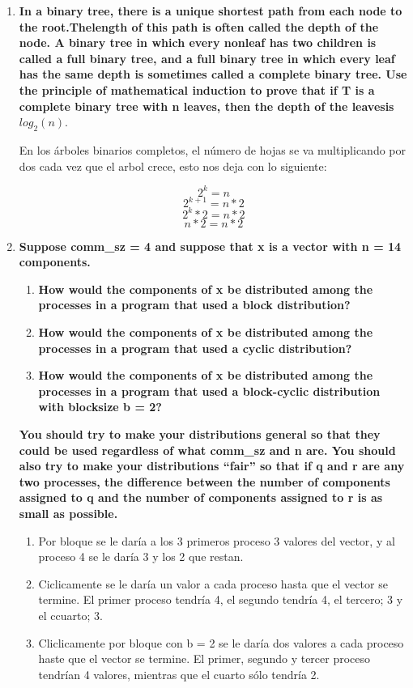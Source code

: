 \documentclass[a4paper,12pt]{article}
\begin{document}
\begin{enumerate}
\item \textbf{In a binary tree, there is a unique shortest path from each node to the root.Thelength of this path
is often called the depth of the node. A binary tree in which every nonleaf has two children is called a full binary tree,
and a full binary tree in which every leaf has the same depth is sometimes called a complete binary tree. 
Use the principle of mathematical induction to prove that if T is a complete binary tree with n leaves, 
then the depth of the leavesis $log_{2} (n).$}

En los árboles binarios completos, el número de hojas se va multiplicando por dos cada vez que el arbol crece, esto nos
deja con lo siguiente:

$$2^{k} = n$$
$$2^{k+1} = n * 2$$
$$2^{k} * 2 = n * 2$$
$$n * 2 = n * 2$$

\item {\textbf{Suppose comm\_sz = 4 and suppose that x is a vector with n = 14 components.} \\
\begin{enumerate}
 \item \textbf{How would the components of x be distributed among the processes in a
program that used a block distribution?}
\item \textbf{How would the components of x be distributed among the processes in a
program that used a cyclic distribution?}
\item \textbf{How would the components of x be distributed among the processes in a
program that used a block-cyclic distribution with blocksize b = 2?}
\end{enumerate}
\textbf{You should try to make your distributions general so that they could be used regardless of what comm\_sz and n are.
You should also try to make your distributions ``fair'' so that if q and r are any two processes, the difference between
the number of components assigned to q and the number of components assigned to r is as small as possible.}
}

\begin{enumerate}
 \item Por bloque se le daría a los 3 primeros proceso 3 valores del vector, y al proceso 4 se le daría 3 y los 2 que restan.
 \item Ciclicamente se le daría un valor a cada proceso hasta que el vector se termine. El primer proceso tendría 4, el segundo
 tendría 4, el tercero; 3 y el ccuarto; 3.
 \item Cliclicamente por bloque con b = 2 se le daría dos valores a cada proceso haste que el vector se termine. El primer, segundo
  y tercer proceso tendrían 4 valores, mientras que el cuarto sólo tendría 2.
\end{enumerate}


\end{enumerate}
\end{document}
